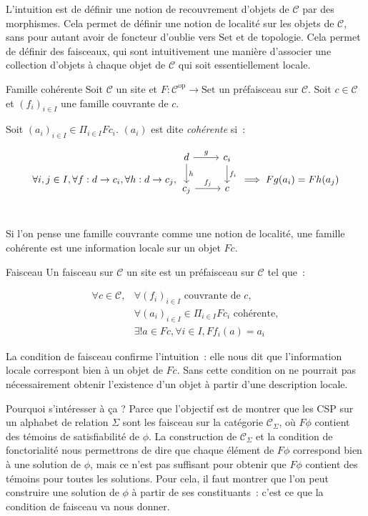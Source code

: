 \documentclass[12pt]{article}
\newcommand\Set{\text{Set}}
\renewcommand\C{\mathscr{C}}
\begin{document}
L'intuition est de définir une notion de recouvrement d'objets de $\C$ par des morphismes.
Cela permet de définir une notion de localité sur les objets de $\C$, sans pour autant
avoir de foncteur d'oublie vers $\Set$ et de topologie. Cela permet de définir des
faisceaux, qui sont intuitivement une manière d'associer une collection d'objets à
chaque objet de $\C$ qui soit essentiellement locale.

\begin{defi}{Famille cohérente}
    Soit $\C$ un site et $F : \C^{\text{op}}\rightarrow\Set$ un préfaisceau sur
    $\C$. Soit $c\in\C$ et $(f_i)_{i\in I}$ une famille couvrante de $c$.
    
    Soit $(a_i)_{i\in I}\in \Pi_{i\in I} Fc_i$. $(a_i)$ est dite \emph{cohérente} si~:

    \[\forall i,j\in I, \forall f : d\rightarrow c_i, \forall h : d\rightarrow c_j,
      \begin{tikzcd}
          d \arrow[r, "g"] \arrow[d, "h"] & c_i \arrow[d, "f_i"] \\
          c_j \arrow[r, "f_j"] & c \\
      \end{tikzcd}
      \implies Fg(a_i) = Fh(a_j) \]
\end{defi}

Si l'on pense une famille couvrante comme une notion de localité, une famille cohérente
est une information locale sur un objet $Fc$.

\begin{defi}{Faisceau}
    Un faisceau sur $\C$ un site est un préfaisceau sur $\C$ tel que~:

    \begin{align*}
        \forall c\in\C, & \forall (f_i)_{i\in I}\text{ couvrante de } c, \\
                        & \forall (a_i)_{i\in I}\in\Pi_{i\in I}Fc_i \text{ cohérente}, \\
                        & \exists ! a\in Fc, \forall i\in I, Ff_i(a) = a_i
    \end{align*}
\end{defi}

La condition de faisceau confirme l'intuition~: elle nous dit que l'information locale
correspont bien à un objet de $Fc$. Sans cette condition on ne pourrait pas nécessairement
obtenir l'existence d'un objet à partir d'une description locale.

Pourquoi s'intéresser à ça ? Parce que l'objectif est de montrer que les CSP sur un 
alphabet de relation $\Sigma$ sont les faisceau sur la catégorie $\C_\Sigma$,
où $F\phi$ contient des témoins de satisfiabilité de $\phi$. La construction de $\C_\Sigma$
et la condition de fonctorialité nous permettrons de dire que chaque élément de $F\phi$
correspond bien à une solution de $\phi$, mais ce n'est pas suffisant pour obtenir que
$F\phi$ contient des témoins pour toutes les solutions. Pour cela, il faut montrer que
l'on peut construire une solution de $\phi$ à partir de ses constituants~: c'est ce que
la condition de faisceau va nous donner.
\end{document}
